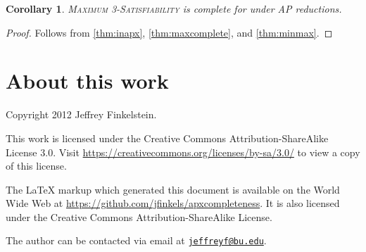 \documentclass[]{article}
\theoremstyle{plain}
\newtheorem{corollary}{Corollary}
\newtheorem{todo}{TODO}
\theoremstyle{definition}
\newcommand{\email}[1]{\href{mailto:#1}{\nolinkurl{#1}}}
\begin{document}

\begin{corollary}
  \textsc{Maximum 3-Satisfiability} is complete for \APX{} under AP reductions.
\end{corollary}
\begin{proof}
  Follows from \autoref{thm:inapx}, \autoref{thm:maxcomplete}, and \autoref{thm:minmax}.
\end{proof}

\section*{About this work}

Copyright 2012 Jef{}frey Finkelstein.

This work is licensed under the Creative Commons Attribution-ShareAlike License 3.0.
Visit \mbox{\url{https://creativecommons.org/licenses/by-sa/3.0/}} to view a copy of this license.

The \LaTeX{} markup which generated this document is available on the World Wide Web at \mbox{\url{https://github.com/jfinkels/apxcompleteness}}.
It is also licensed under the Creative Commons Attribution-ShareAlike License.

The author can be contacted via email at \email{jeffreyf@bu.edu}.



\end{document}
